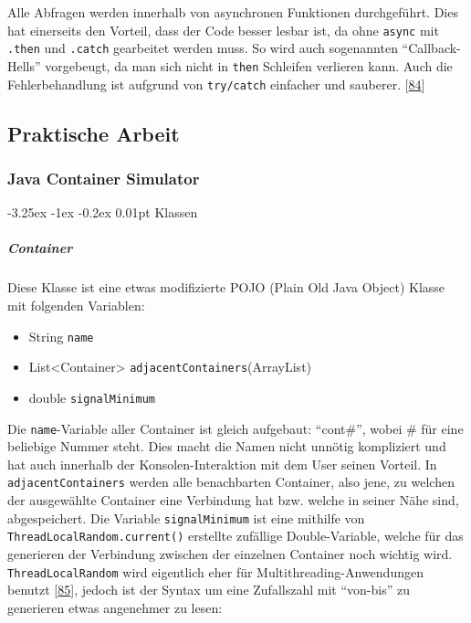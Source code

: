 \documentclass[
    headings=optiontotocandhead,%
    twoside,
    numbers=noenddot,%
    12pt, %
    titlepage, %
    parskip=full, %
    listof=leveldown, 
    numbers=noenddot, %
    a4paper,DIV=14,
    BCOR=15mm,
]{scrbook}
\makeatletter
\newcommand{\passthrough}[1]{#1}
\providecommand{\tightlist}{%
  \setlength{\itemsep}{0pt}\setlength{\parskip}{0pt}}
\renewcommand\paragraph{\@startsection{paragraph}{4}{\z@}%
    {-3.25ex \@plus -1ex \@minus -0.2ex}%
    {0.01pt}%
    {\raggedsection\normalfont\sectfont\nobreak\size@paragraph}%
  }
\makeatother
\begin{document}
Alle Abfragen werden innerhalb von asynchronen Funktionen durchgeführt.
Dies hat einerseits den Vorteil, dass der Code besser lesbar ist, da
ohne \passthrough{\lstinline!async!} mit \passthrough{\lstinline!.then!}
und \passthrough{\lstinline!.catch!} gearbeitet werden muss. So wird
auch sogenannten ``Callback-Hells'' vorgebeugt, da man sich nicht in
\passthrough{\lstinline!then!} Schleifen verlieren kann. Auch die
Fehlerbehandlung ist aufgrund von \passthrough{\lstinline!try/catch!}
einfacher und sauberer. {[}\protect\hyperlink{ref-gpt-WarumAsync}{84}{]}

\hypertarget{praktische-arbeit-2}{%
\subsection{Praktische Arbeit}\label{praktische-arbeit-2}}

\hypertarget{java-container-simulator-1}{%
\subsubsection{Java Container
Simulator}\label{java-container-simulator-1}}

\hypertarget{klassen}{%
\paragraph{Klassen}\label{klassen}}

\hypertarget{container-1}{%
\subparagraph{Container}\label{container-1}}

Diese Klasse ist eine etwas modifizierte POJO (Plain Old Java Object)
Klasse mit folgenden Variablen:

\begin{itemize}
\tightlist
\item
  String \passthrough{\lstinline!name!}
\item
  List\textless Container\textgreater{}
  \passthrough{\lstinline!adjacentContainers!}(ArrayList)
\item
  double \passthrough{\lstinline!signalMinimum!}
\end{itemize}

Die \passthrough{\lstinline!name!}-Variable aller Container ist gleich
aufgebaut: ``cont\#'', wobei \# für eine beliebige Nummer steht. Dies
macht die Namen nicht unnötig kompliziert und hat auch innerhalb der
Konsolen-Interaktion mit dem User seinen Vorteil. In
\passthrough{\lstinline!adjacentContainers!} werden alle benachbarten
Container, also jene, zu welchen der ausgewählte Container eine
Verbindung hat bzw. welche in seiner Nähe sind, abgespeichert. Die
Variable \passthrough{\lstinline!signalMinimum!} ist eine mithilfe von
\passthrough{\lstinline!ThreadLocalRandom.current()!} erstellte
zufällige Double-Variable, welche für das generieren der Verbindung
zwischen der einzelnen Container noch wichtig wird.
\passthrough{\lstinline!ThreadLocalRandom!} wird eigentlich eher für
Multithreading-Anwendungen benutzt
{[}\protect\hyperlink{ref-Baeldung-JavaRandom}{85}{]}, jedoch ist der
Syntax um eine Zufallszahl mit ``von-bis'' zu generieren etwas
angenehmer zu lesen:
\end{document}
